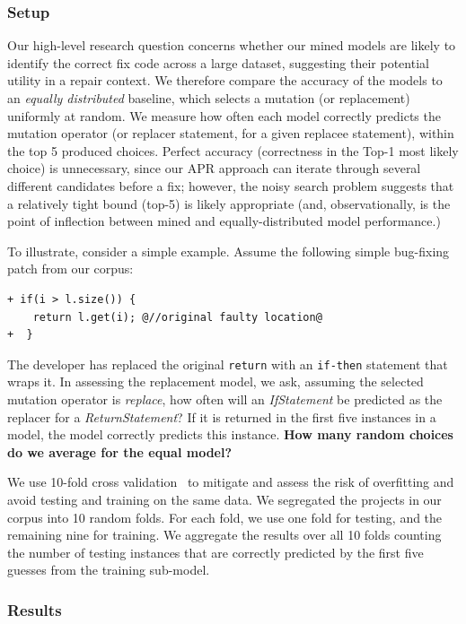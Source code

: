 \documentclass[conference]{IEEEtran}
\newcommand{\todo}[1]
  {{\scriptsize \textbf{\color{red} {#1}}}}
\begin{document}
\subsubsection{Setup}
Our high-level research question concerns whether 
our mined models are likely to identify the correct fix code across a large
dataset, suggesting their potential utility in a repair context.  We therefore
compare the accuracy of the models to an \emph{equally distributed} baseline,
which selects a mutation (or replacement) uniformly at random. 
We measure how often each model correctly predicts the mutation operator (or
replacer statement, for a given replacee statement), within the top 5 produced
choices. Perfect accuracy (correctness in the Top-1 most likely choice) is
unnecessary, since our APR approach can iterate through several
different candidates before a fix; 
however, the noisy search problem suggests that a relatively tight bound (top-5)
is likely appropriate (and, observationally, is the point of inflection between
mined and equally-distributed model performance.)

To illustrate, consider a simple example. Assume the following
simple bug-fixing patch from our corpus: 

\begin{lstlisting}[frame=single]
+ if(i > l.size()) {
    return l.get(i); @//original faulty location@
+  }    
\end{lstlisting}

The developer has replaced the original \texttt{return} with an
\texttt{if-then} statement that wraps it.  In assessing the replacement model,
we ask, assuming the selected mutation operator 
is \emph{replace}, how often will an \emph{IfStatement} be predicted as the
replacer for a \emph{ReturnStatement}? If it is returned in the first five
instances in a model, the model correctly predicts this instance.
\todo{How many random choices do we average for the equal model?}

We use 10-fold cross validation~\cite{kohavi95} to mitigate and assess the risk
of overfitting and avoid testing and training on the same data.  We segregated
the projects in our corpus into 10 random folds. For each fold, we use one fold
for testing, and the remaining nine for training. We aggregate the results over
all 10 folds counting the number of testing instances that are correctly
predicted by the first five guesses from the training sub-model.

\subsubsection{Results} 
\end{document}
